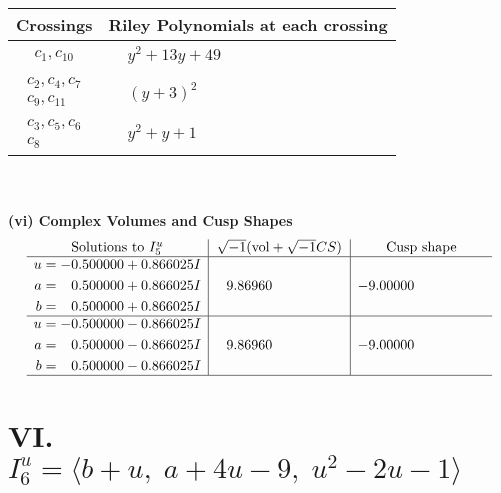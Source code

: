 \documentclass[1p]{elsarticle_modified}
\theoremstyle{definition}
\newcommand{\I}{\sqrt{-1}}
\begin{document}
\begin{tabular}{m{50pt}|m{274pt}}
Crossings & \hspace{64pt}Riley Polynomials at each crossing \\
\hline $$\begin{aligned}c_{1},c_{10}\end{aligned}$$&$\begin{aligned}
&y^2+13 y+49
\end{aligned}$\\
\hline $$\begin{aligned}c_{2},c_{4},c_{7}\\c_{9},c_{11}\end{aligned}$$&$\begin{aligned}
&(y+3)^2
\end{aligned}$\\
\hline $$\begin{aligned}c_{3},c_{5},c_{6}\\c_{8}\end{aligned}$$&$\begin{aligned}
&y^2+y+1
\end{aligned}$\\
\hline
\end{tabular}\\~\\
\newpage\flushleft \textbf{(vi) Complex Volumes and Cusp Shapes}
$$\begin{array}{c|c|c}  
\text{Solutions to }I^u_{5}& \I (\text{vol} + \sqrt{-1}CS) & \text{Cusp shape}\\
 \hline 
\begin{aligned}
u &= -0.500000 + 0.866025 I \\
a &= \phantom{-}0.500000 + 0.866025 I \\
b &= \phantom{-}0.500000 + 0.866025 I\end{aligned}
 & \phantom{-}9.86960\phantom{ +0.000000I} & -9.00000\phantom{ +0.000000I} \\ \hline\begin{aligned}
u &= -0.500000 - 0.866025 I \\
a &= \phantom{-}0.500000 - 0.866025 I \\
b &= \phantom{-}0.500000 - 0.866025 I\end{aligned}
 & \phantom{-}9.86960\phantom{ +0.000000I} & -9.00000\phantom{ +0.000000I}\\
 \hline 
 \end{array}$$\newpage\newpage\renewcommand{\arraystretch}{1}
\centering \section*{VI. $I^u_{6}= \langle b+u,\;a+4 u-9,\;u^2-2 u-1 \rangle$}
\end{document}
